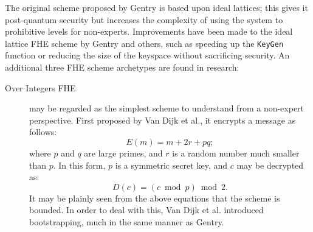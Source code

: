 \documentclass[dvips,12pt]{article}
\begin{document}
\par The original scheme proposed by Gentry is based upon ideal lattices; this gives it post-quantum security but 
increases the complexity of using the system to prohibitive levels for non-experts. Improvements have been made to the ideal lattice FHE scheme by
Gentry and others, such as speeding up the \texttt{KeyGen} function\cite{gentryimp} or reducing the size of the keyspace without sacrificing
security.\cite{smartvercauteren} An additional three FHE scheme archetypes are found in research:
\begin{description}
\item[Over Integers FHE] may be regarded as the simplest scheme to understand from a non-expert perspective. First proposed by Van Dijk et al.,\cite{vd} it encrypts a message as follows:
\begin{equation}
E(m) = m + 2r + pq;
\end{equation}
where $p$ and $q$ are large primes, and $r$ is a random number much smaller than $p$. In this form, $p$ is a symmetric secret key, and $c$ may be decrypted as:
\begin{equation}
D(c) = (c \bmod p) \bmod 2.
\end{equation}
It may be plainly seen from the above equations that the scheme is bounded. In order to deal with this, Van Dijk et al. introduced bootstrapping, much in the same manner as Gentry. 

\end{description}



\end{document}
